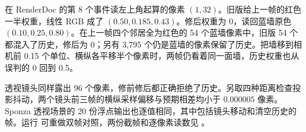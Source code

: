 在 RenderDoc 的第 8 个事件读左上角起算的像素 $(1,32)$。旧版给上一帧的红色一半权重，线性 RGB 成了 $(0.50,0.185,0.43)$。修后权重为 0，读回蓝墙原色 $(0.10,0.25,0.80)$。在上一帧四个邻居全为红色的 54 个蓝墙像素中，旧版 54 个都混入了历史，修后为 0；另有 3,795 个仍是蓝墙的像素保留了历史。把墙移到相机前 0.15 个单位、横纵各平移半个像素时，两帧仍看着同一面墙，历史权重也从误判的 0 回到 0.5。

透视镜头同样露出 96 个像素，修前修后都正确拒绝了历史。另取四种距离检查投影抖动，两个镜头前三帧的横纵采样偏移与预期相差均小于 $0.000005$ 像素。Sponza 透视场景的 20 份浮点输出也逐值相同，其中包括镜头移动和清空历史的帧。运行  可重做双帧对照，两份截帧和逐像素读数见 。
